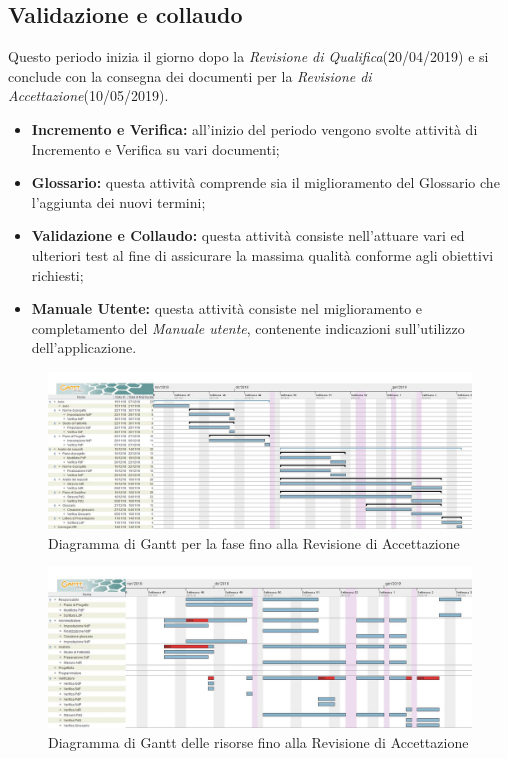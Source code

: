 \subsection{Validazione e collaudo}
Questo periodo inizia il giorno dopo la  \textit{Revisione di Qualifica}(20/04/2019) e si conclude con la consegna dei documenti per la  \textit{Revisione di Accettazione}(10/05/2019). 
\begin{itemize}
	\item{\textbf{Incremento e Verifica:} all’inizio del periodo vengono svolte attività di Incremento e Verifica su vari documenti;}
	\item{\textbf{Glossario:} questa attività comprende sia il miglioramento del Glossario che l’aggiunta dei nuovi termini;}
	\item{\textbf{Validazione e Collaudo:} questa attività consiste nell'attuare vari ed ulteriori test al fine di assicurare la massima qualità conforme agli obiettivi richiesti;}
	\item{\textbf{Manuale Utente:} questa attività consiste nel miglioramento e completamento del \textit{Manuale utente}, contenente indicazioni sull’utilizzo dell’applicazione.}
\end{itemize}

\begin{figure}[h!]
	\centering
	\includegraphics[width=\textwidth]{Gantt_quarta_fase.jpg}
	\caption{Diagramma di Gantt per la fase fino alla Revisione di Accettazione}
\end{figure}

\begin{figure}[h!]
	\centering
	\includegraphics[width=\textwidth]{Gantt_quarta_fase_risorse.jpg}
	\caption{Diagramma di Gantt delle risorse fino alla Revisione di Accettazione}
\end{figure}

